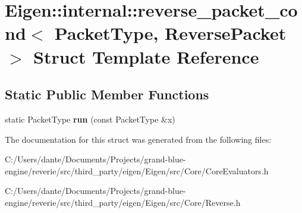 \hypertarget{struct_eigen_1_1internal_1_1reverse__packet__cond}{}\section{Eigen\+::internal\+::reverse\+\_\+packet\+\_\+cond$<$ Packet\+Type, Reverse\+Packet $>$ Struct Template Reference}
\label{struct_eigen_1_1internal_1_1reverse__packet__cond}
\subsection*{Static Public Member Functions}
\begin{DoxyCompactItemize}
\item 
\mbox{\label{struct_eigen_1_1internal_1_1reverse__packet__cond_a437e133d7ec9a49867b7b11030c9ca6c}} 
static Packet\+Type {\bfseries run} (const Packet\+Type \&x)
\end{DoxyCompactItemize}


The documentation for this struct was generated from the following files\+:\begin{DoxyCompactItemize}
\item 
C\+:/\+Users/dante/\+Documents/\+Projects/grand-\/blue-\/engine/reverie/src/third\+\_\+party/eigen/\+Eigen/src/\+Core/Core\+Evaluators.\+h\item 
C\+:/\+Users/dante/\+Documents/\+Projects/grand-\/blue-\/engine/reverie/src/third\+\_\+party/eigen/\+Eigen/src/\+Core/Reverse.\+h\end{DoxyCompactItemize}

